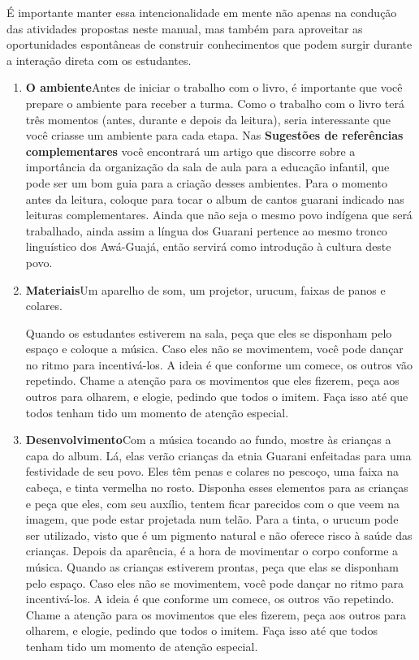 \documentclass[11pt]{extarticle}
\begin{document}
É importante manter essa intencionalidade em mente não apenas na condução 
das atividades propostas neste manual, mas também para aproveitar as 
oportunidades espontâneas de construir conhecimentos que podem surgir durante 
a interação direta com os estudantes.

\begin{enumerate}
\item \textbf{O ambiente}\quad Antes de iniciar o trabalho com o livro, é importante que você 
prepare o ambiente para receber a turma. Como o trabalho com o livro terá 
três momentos (antes, durante e depois da leitura), seria interessante que você 
criasse um ambiente para cada etapa. Nas \textbf{Sugestões de referências complementares} 
você encontrará um artigo que discorre sobre a importância da organização da sala 
de aula para a educação infantil, que pode ser um bom guia para a criação desses 
ambientes. Para o momento antes da leitura, coloque para tocar o album de cantos 
guarani indicado nas leituras complementares. Ainda que não seja o mesmo povo
indígena que será trabalhado, ainda assim a língua dos Guarani pertence ao mesmo tronco
linguístico dos Awá-Guajá, então servirá como introdução à cultura deste povo.


\item \textbf{Materiais}\quad Um aparelho de som, um projetor, urucum, 
faixas de panos e colares. 

Quando os estudantes estiverem na sala,
peça que eles se disponham pelo espaço e coloque a música. Caso eles não 
se movimentem, você pode dançar no ritmo para incentivá-los. A ideia é que
conforme um comece, os outros vão repetindo. Chame a atenção para os movimentos
que eles fizerem, peça aos outros para olharem, e elogie, pedindo que todos
o imitem. Faça isso até que todos tenham tido um momento de atenção especial. 


\item \textbf{Desenvolvimento}\quad Com a música tocando ao fundo, mostre
às crianças a capa do album. Lá, elas verão crianças da etnia Guarani
enfeitadas para uma festividade de seu povo. Eles têm penas e colares no
pescoço, uma faixa na cabeça, e tinta vermelha no rosto. Disponha esses 
elementos para as crianças e peça que eles, com seu auxílio, tentem
ficar parecidos com o que veem na imagem, que pode estar projetada num telão. 
Para a tinta, o urucum pode ser utilizado, visto que é um pigmento natural
e não oferece risco à saúde das crianças.
Depois da aparência, é a hora de movimentar o corpo conforme a música.
Quando as crianças estiverem prontas, peça que elas se disponham pelo espaço. 
Caso eles não se movimentem, você pode dançar no ritmo para incentivá-los. A ideia é que
conforme um comece, os outros vão repetindo. Chame a atenção para os movimentos
que eles fizerem, peça aos outros para olharem, e elogie, pedindo que todos
o imitem. Faça isso até que todos tenham tido um momento de atenção especial. 


\end{enumerate}
\end{document}

